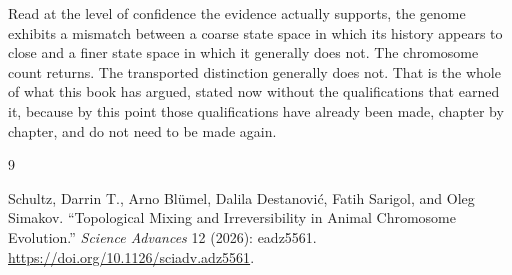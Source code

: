 \documentclass[11pt]{book}
\begin{document}
Read at the level of confidence the evidence actually supports, the genome exhibits a mismatch between a coarse state space in which its history appears to close and a finer state space in which it generally does not. The chromosome count returns. The transported distinction generally does not. That is the whole of what this book has argued, stated now without the qualifications that earned it, because by this point those qualifications have already been made, chapter by chapter, and do not need to be made again.

\backmatter

\begin{thebibliography}{9}

Schultz, Darrin T., Arno Bl\"umel, Dalila Destanovi\'c, Fatih Sarigol, and Oleg Simakov. ``Topological Mixing and Irreversibility in Animal Chromosome Evolution.'' \textit{Science Advances} 12 (2026): eadz5561. \url{https://doi.org/10.1126/sciadv.adz5561}.

\end{thebibliography}
\end{document}
